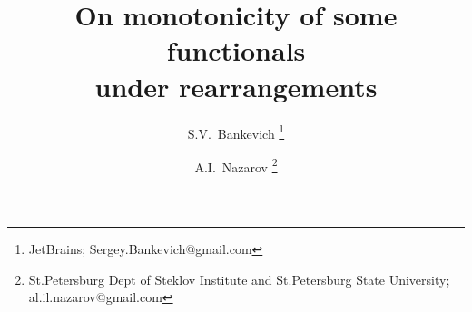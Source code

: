\documentclass[12pt]{article}
\begin{document}
\title{On monotonicity of some functionals \\ under rearrangements}
\author{
S.V.~Bankevich
\footnote{JetBrains; Sergey.Bankevich@gmail.com}
\and
A.I.~Nazarov
\footnote{St.Petersburg Dept of Steklov Institute and St.Petersburg State University; al.il.nazarov@gmail.com}
}

\maketitle






















\end{document}

